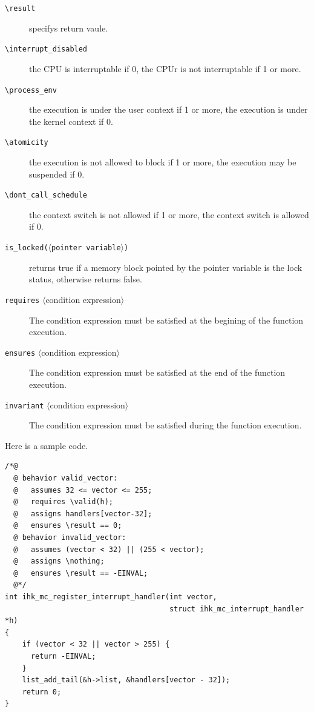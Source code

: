 \documentclass[twoside,11pt,fleqn]{book}
\begin{document}
\begin{description}
\item[\texttt{{\textbackslash}result}] specifys return vaule.
\item[\texttt{{\textbackslash}interrupt\_disabled}]
the CPU is interruptable if 0,
the CPUr is not interruptable if 1 or more.
\item[\texttt{{\textbackslash}process\_env}] 
the execution is under the user context if 1 or more,
the execution is under the kernel context if 0.
\item[\texttt{{\textbackslash}atomicity}] 
the execution is not allowed to block if 1 or more,
the execution may be suspended if 0.
\item[\texttt{{\textbackslash}dont\_call\_schedule}] 
the context switch is not allowed if 1 or more,
the context switch is allowed if 0.
\item[\texttt{is\_locked($\langle$pointer variable$\rangle$)}]
returns true if a memory block pointed by the pointer variable is the
lock status, otherwise
returns false.
\item[\texttt{requires} $\langle$condition expression$\rangle$]
The condition expression must be satisfied at the begining of the function
execution.
\item[\texttt{ensures} $\langle$condition expression$\rangle$]
The condition expression must be satisfied at the end of the function
execution.
\item[\texttt{invariant} $\langle$condition expression$\rangle$] 
The condition expression must be satisfied during the function execution.
\end{description}

Here is a sample code.
\begin{verbatim}
/*@
  @ behavior valid_vector:
  @   assumes 32 <= vector <= 255;
  @   requires \valid(h);
  @   assigns handlers[vector-32];
  @   ensures \result == 0;
  @ behavior invalid_vector:
  @   assumes (vector < 32) || (255 < vector);
  @   assigns \nothing;
  @   ensures \result == -EINVAL;
  @*/
int ihk_mc_register_interrupt_handler(int vector,
                                      struct ihk_mc_interrupt_handler *h)
{
    if (vector < 32 || vector > 255) {
      return -EINVAL;
    }
    list_add_tail(&h->list, &handlers[vector - 32]);
    return 0;
}
\end{verbatim}
\end{document}
